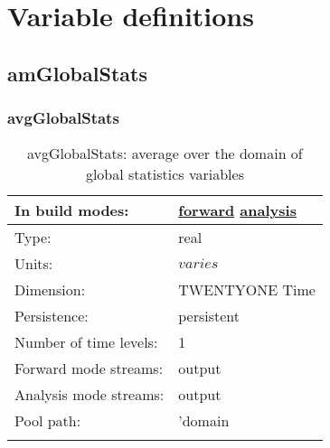 \chapter[Variable definitions]{Variable definitions}
\label{chap:variable_sections}
\section[amGlobalStats]{amGlobalStats}
\label{sec:var_sec_amGlobalStats}
\subsection[avgGlobalStats]{avgGlobalStats}
\label{subsec:var_sec_amGlobalStats_avgGlobalStats}
\begin{center}
\begin{longtable}{| p{2.0in} | p{4.0in} |}
        \hline 
        In build modes: & \hyperref[subsec:forward_var_tab_amGlobalStats]{forward} \hyperref[subsec:analysis_var_tab_amGlobalStats]{analysis} \\
        \hline 
        Type: & real \\
        \hline 
        Units: & $varies$ \\
        \hline 
        Dimension: & TWENTYONE Time \\
        \hline 
        Persistence: & persistent \\
        \hline 
        Number of time levels: & 1 \\
        \hline 
		 Forward mode streams: &  output \\
        \hline 
		 Analysis mode streams: &  output \\
        \hline 
            Pool path: & 'domain %
 \\
		 \hline 
    \caption{avgGlobalStats: average over the domain of global statistics variables}
\end{longtable}
\end{center}

